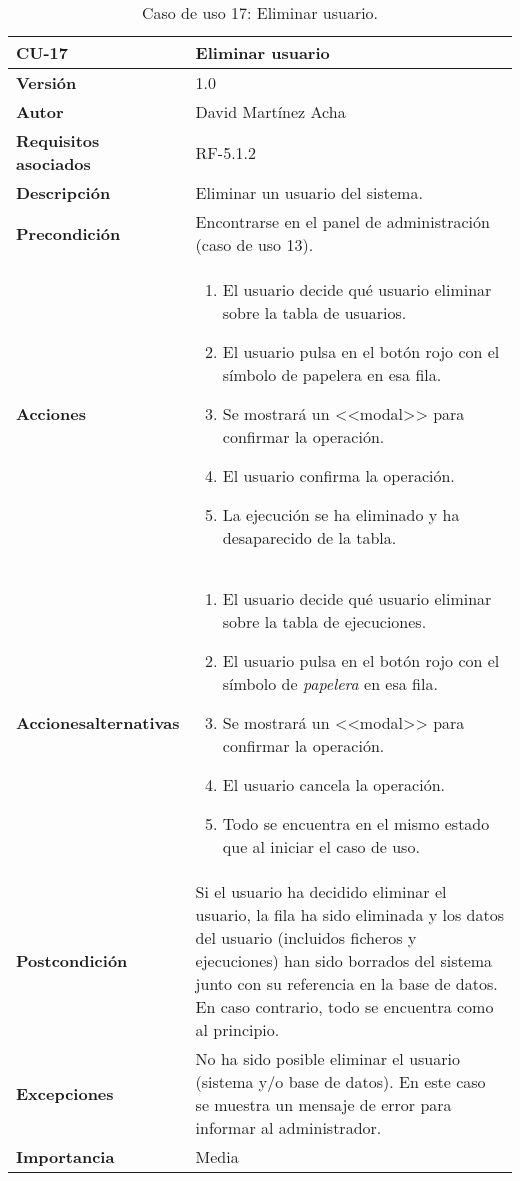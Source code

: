 \begin{table}[p]
	\centering
	\begin{tabularx}{\linewidth}{ p{} p{} }
		\toprule
		\textbf{CU-17}    & \textbf{Eliminar usuario}\\
		\toprule
		\textbf{Versión}              & 1.0    \\
		\textbf{Autor}                & David Martínez Acha \\
		\textbf{Requisitos asociados} & RF-5.1.2 \\
		\textbf{Descripción}          & Eliminar un usuario del sistema. \\
		\textbf{Precondición}         & Encontrarse en el panel de administración (caso de uso 13). \\
		\textbf{Acciones}             &
		\begin{enumerate}
			\def\labelenumi{\arabic{enumi}.}
			\tightlist
			\item El usuario decide qué usuario eliminar sobre la tabla de usuarios.
			\item El usuario pulsa en el botón rojo con el símbolo de papelera en esa fila.
			\item Se mostrará un <<modal>> para confirmar la operación.
			\item El usuario confirma la operación.
			\item La ejecución se ha eliminado y ha desaparecido de la tabla.
		\end{enumerate}\\
		\textbf{Acciones\newline alternativas}&
		\begin{enumerate}
			\def\labelenumi{\arabic{enumi}.}
			\tightlist
			\item El usuario decide qué usuario eliminar sobre la tabla de ejecuciones.
			\item El usuario pulsa en el botón rojo con el símbolo de \textit{papelera} en esa fila.
			\item Se mostrará un <<modal>> para confirmar la operación.
			\item El usuario cancela la operación.
			\item Todo se encuentra en el mismo estado que al iniciar el caso de uso.
		\end{enumerate}\\
		\textbf{Postcondición}        & Si el usuario ha decidido eliminar el usuario, la fila ha sido eliminada y los datos del usuario (incluidos ficheros y ejecuciones) han sido borrados del sistema junto con su referencia en la base de datos. 
		En caso contrario, todo se encuentra como al principio.\\
		\textbf{Excepciones}          & No ha sido posible eliminar el usuario (sistema y/o base de datos). En este caso se muestra un mensaje de error para informar al administrador. \\
		\textbf{Importancia}          & Media \\
		\bottomrule
	\end{tabularx}
	\caption{Caso de uso 17: Eliminar usuario.}
\end{table}

